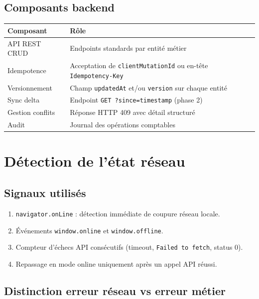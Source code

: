\documentclass[12pt,a4paper]{report}
\begin{document}
\section{Composants backend}

\begin{longtable}{@{}p{3.5cm}p{9.5cm}@{}}
\hline
\textbf{Composant} & \textbf{Rôle} \\
\hline

API REST CRUD & Endpoints standards par entité métier \\
Idempotence & Acceptation de \texttt{clientMutationId} ou en-tête \texttt{Idempotency-Key} \\
Versionnement & Champ \texttt{updatedAt} et/ou \texttt{version} sur chaque entité \\
Sync delta & Endpoint \texttt{GET ?since=timestamp} (phase 2) \\
Gestion conflits & Réponse HTTP 409 avec détail structuré \\
Audit & Journal des opérations comptables \\
\hline
\end{longtable}

\chapter{Détection de l'état réseau}

\section{Signaux utilisés}

\begin{enumerate}
  \item \texttt{navigator.onLine} : détection immédiate de coupure réseau locale.
  \item Événements \texttt{window.online} et \texttt{window.offline}.
  \item Compteur d'échecs API consécutifs (timeout, \texttt{Failed to fetch}, status 0).
  \item Repassage en mode online uniquement après un appel API réussi.
\end{enumerate}

\section{Distinction erreur réseau vs erreur métier}
\end{document}
